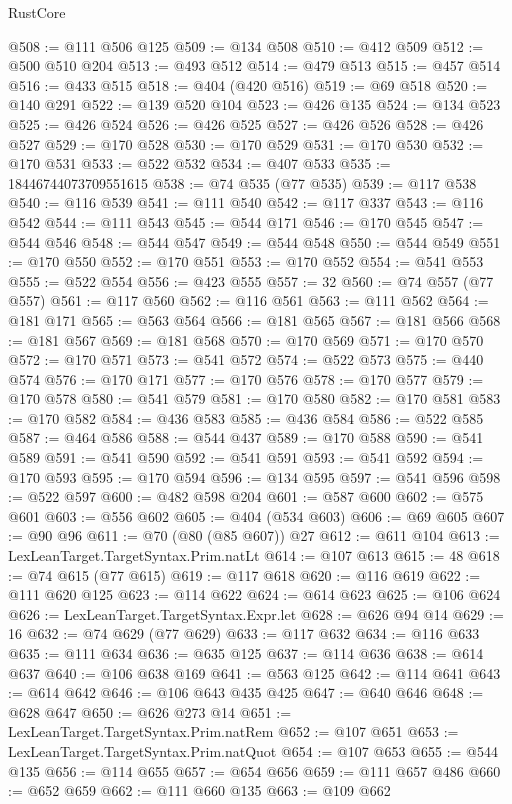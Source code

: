 \begin{lexlean}{RustCore}
\begin{coremodule}
@508 := @111 @506 @125
@509 := @134 @508
@510 := @412 @509
@512 := @500 @510 @204
@513 := @493 @512
@514 := @479 @513
@515 := @457 @514
@516 := @433 @515
@518 := @404 (@420 @516)
@519 := @69 @518
@520 := @140 @291
@522 := @139 @520 @104
@523 := @426 @135
@524 := @134 @523
@525 := @426 @524
@526 := @426 @525
@527 := @426 @526
@528 := @426 @527
@529 := @170 @528
@530 := @170 @529
@531 := @170 @530
@532 := @170 @531
@533 := @522 @532
@534 := @407 @533
@535 := 18446744073709551615
@538 := @74 @535 (@77 @535)
@539 := @117 @538
@540 := @116 @539
@541 := @111 @540
@542 := @117 @337
@543 := @116 @542
@544 := @111 @543
@545 := @544 @171
@546 := @170 @545
@547 := @544 @546
@548 := @544 @547
@549 := @544 @548
@550 := @544 @549
@551 := @170 @550
@552 := @170 @551
@553 := @170 @552
@554 := @541 @553
@555 := @522 @554
@556 := @423 @555
@557 := 32
@560 := @74 @557 (@77 @557)
@561 := @117 @560
@562 := @116 @561
@563 := @111 @562
@564 := @181 @171
@565 := @563 @564
@566 := @181 @565
@567 := @181 @566
@568 := @181 @567
@569 := @181 @568
@570 := @170 @569
@571 := @170 @570
@572 := @170 @571
@573 := @541 @572
@574 := @522 @573
@575 := @440 @574
@576 := @170 @171
@577 := @170 @576
@578 := @170 @577
@579 := @170 @578
@580 := @541 @579
@581 := @170 @580
@582 := @170 @581
@583 := @170 @582
@584 := @436 @583
@585 := @436 @584
@586 := @522 @585
@587 := @464 @586
@588 := @544 @437
@589 := @170 @588
@590 := @541 @589
@591 := @541 @590
@592 := @541 @591
@593 := @541 @592
@594 := @170 @593
@595 := @170 @594
@596 := @134 @595
@597 := @541 @596
@598 := @522 @597
@600 := @482 @598 @204
@601 := @587 @600
@602 := @575 @601
@603 := @556 @602
@605 := @404 (@534 @603)
@606 := @69 @605
@607 := @90 @96
@611 := @70 (@80 (@85 @607)) @27
@612 := @611 @104
@613 := LexLeanTarget.TargetSyntax.Prim.natLt
@614 := @107 @613
@615 := 48
@618 := @74 @615 (@77 @615)
@619 := @117 @618
@620 := @116 @619
@622 := @111 @620 @125
@623 := @114 @622
@624 := @614 @623
@625 := @106 @624
@626 := LexLeanTarget.TargetSyntax.Expr.let
@628 := @626 @94 @14
@629 := 16
@632 := @74 @629 (@77 @629)
@633 := @117 @632
@634 := @116 @633
@635 := @111 @634
@636 := @635 @125
@637 := @114 @636
@638 := @614 @637
@640 := @106 @638 @169
@641 := @563 @125
@642 := @114 @641
@643 := @614 @642
@646 := @106 @643 @435 @425
@647 := @640 @646
@648 := @628 @647
@650 := @626 @273 @14
@651 := LexLeanTarget.TargetSyntax.Prim.natRem
@652 := @107 @651
@653 := LexLeanTarget.TargetSyntax.Prim.natQuot
@654 := @107 @653
@655 := @544 @135
@656 := @114 @655
@657 := @654 @656
@659 := @111 @657 @486
@660 := @652 @659
@662 := @111 @660 @135
@663 := @109 @662

\end{coremodule}
\end{lexlean}
